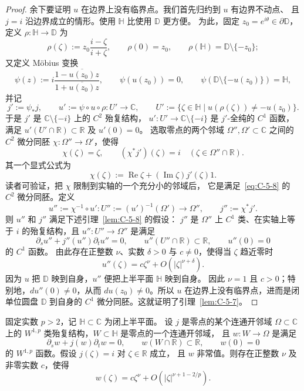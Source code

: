 \begin{proof}
余下要证明 $u$ 在边界上没有临界点。我们首先归约到 $u$ 有边界不动点、
且 $j=i$ 沿边界成立的情形。使用 $\mathbb H$ 比使用 $\mathbb D$ 更方便。
为此，固定 $z_0=e^{i\theta}\in\partial\mathbb D$，定义
$\rho:\mathbb H\to\mathbb D$ 为
\[
  \rho(\zeta):=z_0\frac{i-\zeta}{i+\zeta},\qquad
  \rho(0)=z_0,\qquad \rho(\mathbb H)=\mathbb D\setminus\{-z_0\};
\]
又定义 Möbius 变换
\[
  \psi(z):=i\frac{1-\overline{u(z_0)}z}{1+\overline{u(z_0)}z},
  \qquad\psi(u(z_0))=0,\qquad
  \psi(\mathbb D\setminus\{-u(z_0)\})=\mathbb H,
\]
并记
\[
  j':=\psi_*j,\qquad
  u':=\psi\circ u\circ\rho:U'\to\mathbb C,\qquad
  U':=\{\zeta\in\mathbb H\mid u(\rho(\zeta))\ne-u(z_0)\}.
\]
于是 $j'$ 是 $\mathbb C\setminus\{-i\}$ 上的 $C^2$ 殆复结构，
$u':U'\to\mathbb C\setminus\{-i\}$ 是 $j'$-全纯的 $C^1$ 函数，
满足 $u'(U'\cap\mathbb R)\subset\mathbb R$ 及 $u'(0)=0$。
选取零点的两个邻域 $\Omega'',\Omega'\subset\mathbb C$ 之间的 $C^2$ 微分同胚
$\chi:\Omega''\to\Omega'$，使得
\begin{equation}\label{eq:C-5-8}
  \chi(\zeta)=\zeta,\qquad
  (\chi^*j')(\zeta)=i\quad(\zeta\in\Omega''\cap\mathbb R).
\end{equation}
其一个显式公式为
\[
  \chi(\zeta):=\operatorname{Re}\zeta
       +(\operatorname{Im}\zeta)j'(\zeta)1.
\]
读者可验证，把 $\chi$ 限制到实轴的一个充分小的邻域后，
它是满足~\eqref{eq:C-5-8} 的 $C^2$ 微分同胚。定义
\[
  u'':=\chi^{-1}\circ u':U'':=(u')^{-1}(\Omega')\to\Omega'',
  \qquad j'':=\chi^*j'.
\]
则 $u''$ 和 $j''$ 满足下述引理~\ref{lem:C-5-8} 的假设：
$j''$ 是 $\Omega''$ 上 $C^1$ 类、在实轴上等于 $i$ 的殆复结构，且
$u'':U''\to\Omega''$ 是满足
\[
  \partial_su''+j''(u'')\partial_tu''=0,\qquad
  u''(U''\cap\mathbb R)\subset\mathbb R,\qquad u''(0)=0
\]
的 $C^1$ 函数。
由此存在正整数 $\nu$、实数 $\delta>0$ 与 $c\ne0$，使得当 $\zeta$
趋近零时
\[
  u''(\zeta)=c\zeta^\nu+O(|\zeta|^{\nu+\delta}).
\]
因为 $u$ 把 $\mathbb D$ 映到自身，$u''$ 便把上半平面 $\mathbb H$ 映到自身。
因此 $\nu=1$ 且 $c>0$；特别地，$du''(0)\ne0$，从而
$du(z_0)\ne0$。所以 $u$ 在边界上没有临界点，进而是闭单位圆盘
$\mathbb D$ 到自身的 $C^1$ 微分同胚。这就证明了引理~\ref{lem:C-5-7}。
\end{proof}

\begin{lemma}\label{lem:C-5-8}
固定实数 $p>2$，记 $\mathbb H\subset\mathbb C$ 为闭上半平面。
设 $j$ 是零点的某个连通开邻域 $\Omega\subset\mathbb C$ 上的
$W^{1,p}$ 类殆复结构，$W\subset\mathbb H$ 是零点的一个连通开邻域，
且 $w:W\to\Omega$ 是满足
\begin{equation}\label{eq:C-5-9}
  \partial_sw+j(w)\partial_tw=0,\qquad
  w(W\cap\mathbb R)\subset\mathbb R,\qquad w(0)=0
\end{equation}
的 $W^{1,p}$ 函数。假设 $j(\zeta)=i$ 对 $\zeta\in\mathbb R$ 成立，
且 $w$ 非常值。则存在正整数 $\nu$ 及非零实数 $c$，使得
\begin{equation}\label{eq:C-5-10}
  w(\zeta)=c\zeta^\nu+O(|\zeta|^{\nu+1-2/p}).
\end{equation}
\end{lemma}


